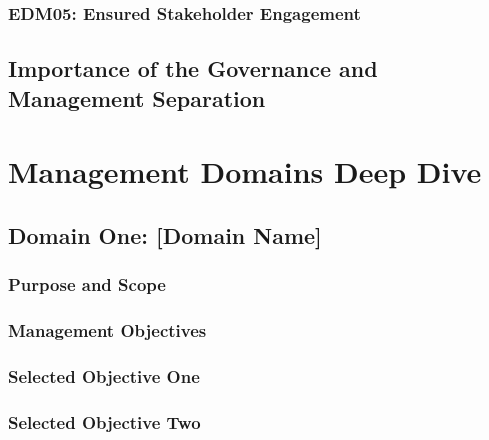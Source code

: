\subsubsection{EDM05: Ensured Stakeholder Engagement}


\subsection{Importance of the Governance and Management Separation}



\section{Management Domains Deep Dive}



\subsection{Domain One: [Domain Name]}

\subsubsection{Purpose and Scope}

\subsubsection{Management Objectives}


\subsubsection{Selected Objective One}


\subsubsection{Selected Objective Two}


